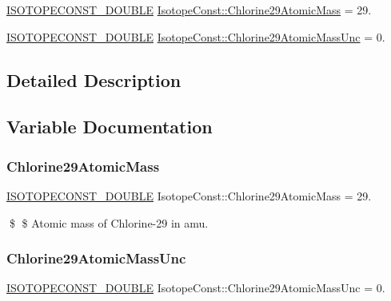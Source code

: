 \begin{DoxyCompactItemize}
\item 
\mbox{\hyperlink{group___isotope_const-_macros_ga8f45a7272ce02c0b4c65c44636ed719a}{I\+S\+O\+T\+O\+P\+E\+C\+O\+N\+S\+T\+\_\+\+D\+O\+U\+B\+LE}} \mbox{\hyperlink{group___isotope_const-_chlorine-_cl29_ga27c33e19d54c55e9c41c860edc9ecff5}{Isotope\+Const\+::\+Chlorine29\+Atomic\+Mass}} = 29.
\item 
\mbox{\hyperlink{group___isotope_const-_macros_ga8f45a7272ce02c0b4c65c44636ed719a}{I\+S\+O\+T\+O\+P\+E\+C\+O\+N\+S\+T\+\_\+\+D\+O\+U\+B\+LE}} \mbox{\hyperlink{group___isotope_const-_chlorine-_cl29_ga47a8962716243bad1af34d7860ad2b16}{Isotope\+Const\+::\+Chlorine29\+Atomic\+Mass\+Unc}} = 0.
\end{DoxyCompactItemize}


\subsection{Detailed Description}


\subsection{Variable Documentation}
\mbox{\label{group___isotope_const-_chlorine-_cl29_ga27c33e19d54c55e9c41c860edc9ecff5}} 
\subsubsection{\texorpdfstring{Chlorine29\+Atomic\+Mass}{Chlorine29AtomicMass}}
{\footnotesize\ttfamily \mbox{\hyperlink{group___isotope_const-_macros_ga8f45a7272ce02c0b4c65c44636ed719a}{I\+S\+O\+T\+O\+P\+E\+C\+O\+N\+S\+T\+\_\+\+D\+O\+U\+B\+LE}} Isotope\+Const\+::\+Chlorine29\+Atomic\+Mass = 29.}

\$ \$ Atomic mass of Chlorine-\/29 in amu. \mbox{\label{group___isotope_const-_chlorine-_cl29_ga47a8962716243bad1af34d7860ad2b16}} 
\subsubsection{\texorpdfstring{Chlorine29\+Atomic\+Mass\+Unc}{Chlorine29AtomicMassUnc}}
{\footnotesize\ttfamily \mbox{\hyperlink{group___isotope_const-_macros_ga8f45a7272ce02c0b4c65c44636ed719a}{I\+S\+O\+T\+O\+P\+E\+C\+O\+N\+S\+T\+\_\+\+D\+O\+U\+B\+LE}} Isotope\+Const\+::\+Chlorine29\+Atomic\+Mass\+Unc = 0.}

